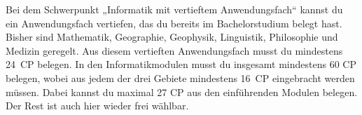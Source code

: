 Bei dem Schwerpunkt „Informatik mit vertieftem Anwendungsfach“ kannst du ein Anwendungsfach vertiefen, das du bereits im Bachelorstudium belegt hast. Bisher sind Mathematik, Geographie, Geophysik, Linguistik, Philosophie und Medizin geregelt. Aus diesem vertieften Anwendungsfach musst du mindestens 24~CP belegen. In den Informatikmodulen musst du insgesamt mindestens 60 CP belegen, wobei aus jedem der drei Gebiete mindestens 16~CP eingebracht werden müssen. Dabei kannst du maximal 27 CP aus den einführenden Modulen belegen. Der Rest ist auch hier wieder frei wählbar.
